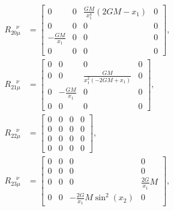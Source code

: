 \documentclass[10pt,onecolumn,dvipdfmx]{article}
\begin{document}
\begin{align}
R_{20\mu }^{\ \ \ \ \nu } &=\left[\begin{matrix}0 & 0 & \frac{G M}{x_{1}^{4}} \left(2 G M - x_{1}\right) & 0\\0 & 0 & 0 & 0\\- \frac{G M}{x_{1}} & 0 & 0 & 0\\0 & 0 & 0 & 0\end{matrix}\right], \\
R_{21\mu }^{\ \ \ \ \nu } &=\left[\begin{matrix}0 & 0 & 0 & 0\\0 & 0 & \frac{G M}{x_{1}^{2} \left(- 2 G M + x_{1}\right)} & 0\\0 & - \frac{G M}{x_{1}} & 0 & 0\\0 & 0 & 0 & 0\end{matrix}\right], \\
R_{22\mu }^{\ \ \ \ \nu } &=\left[\begin{matrix}0 & 0 & 0 & 0\\0 & 0 & 0 & 0\\0 & 0 & 0 & 0\\0 & 0 & 0 & 0\end{matrix}\right], \\
R_{23\mu }^{\ \ \ \ \nu } &=\left[\begin{matrix}0 & 0 & 0 & 0\\0 & 0 & 0 & 0\\0 & 0 & 0 & \frac{2 G}{x_{1}} M\\0 & 0 & - \frac{2 G}{x_{1}} M \sin^{2}{\left (x_{2} \right )} & 0\end{matrix}\right], 
\end{align}
\end{document}
